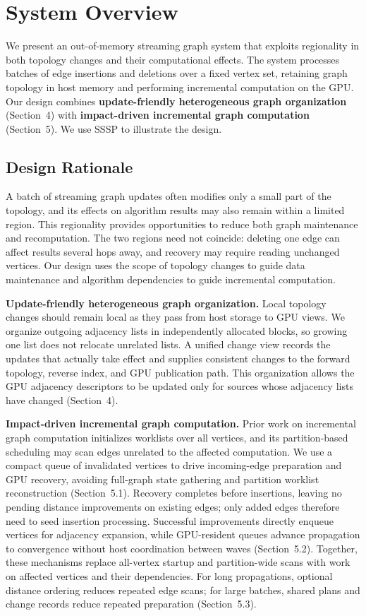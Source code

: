 \section{System Overview}

We present an out-of-memory streaming graph system that exploits regionality in both topology changes and their computational effects. The system processes batches of edge insertions and deletions over a fixed vertex set, retaining graph topology in host memory and performing incremental computation on the GPU. Our design combines \textbf{update-friendly heterogeneous graph organization} (Section~4) with \textbf{impact-driven incremental graph computation} (Section~5). We use SSSP to illustrate the design.

\subsection{Design Rationale}

A batch of streaming graph updates often modifies only a small part of the topology, and its effects on algorithm results may also remain within a limited region. This regionality provides opportunities to reduce both graph maintenance and recomputation. The two regions need not coincide: deleting one edge can affect results several hops away, and recovery may require reading unchanged vertices. Our design uses the scope of topology changes to guide data maintenance and algorithm dependencies to guide incremental computation.

\textbf{Update-friendly heterogeneous graph organization.} Local topology changes should remain local as they pass from host storage to GPU views. We organize outgoing adjacency lists in independently allocated blocks, so growing one list does not relocate unrelated lists. A unified change view records the updates that actually take effect and supplies consistent changes to the forward topology, reverse index, and GPU publication path. This organization allows the GPU adjacency descriptors to be updated only for sources whose adjacency lists have changed (Section~4).

\textbf{Impact-driven incremental graph computation.} Prior work on incremental graph computation initializes worklists over all vertices, and its partition-based scheduling may scan edges unrelated to the affected computation. We use a compact queue of invalidated vertices to drive incoming-edge preparation and GPU recovery, avoiding full-graph state gathering and partition worklist reconstruction (Section~5.1). Recovery completes before insertions, leaving no pending distance improvements on existing edges; only added edges therefore need to seed insertion processing. Successful improvements directly enqueue vertices for adjacency expansion, while GPU-resident queues advance propagation to convergence without host coordination between waves (Section~5.2). Together, these mechanisms replace all-vertex startup and partition-wide scans with work on affected vertices and their dependencies. For long propagations, optional distance ordering reduces repeated edge scans; for large batches, shared plans and change records reduce repeated preparation (Section~5.3).

